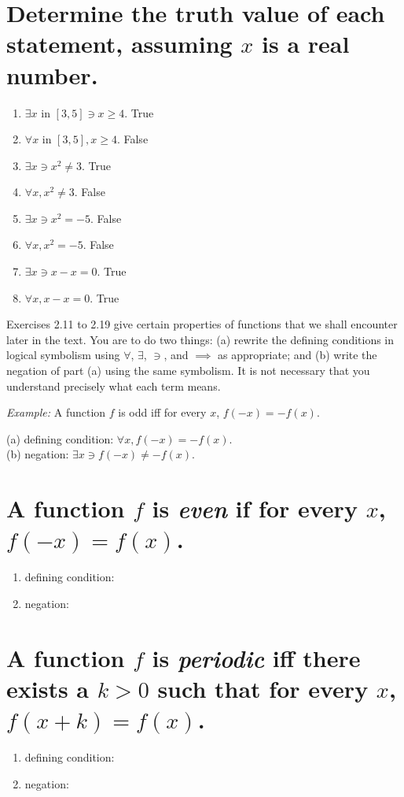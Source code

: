 \documentclass[11pt]{article} %
\begin{document}
\section{Determine the truth value of each statement, assuming $x$ is a real number.}
\begin{enumerate}
\item $\exists x$ in $\left[ 3,5 \right]\ni x\geq4$.
\subitem True
\item $\forall x$ in $\left[ 3,5 \right], x\geq4$.
\subitem False
\item $\exists x \ni x^2 \neq 3$.
\subitem True
\item $\forall x, x^2 \neq 3$.
\subitem False
\item $\exists x \ni x^2 = -5$.
\subitem False
\item $\forall x, x^2 = -5$.
\subitem False
\item $\exists x \ni x-x=0$.
\subitem True
\item $\forall x, x-x=0$.
\subitem True
\end{enumerate}
\noindent
Exercises 2.11 to 2.19 give certain properties of functions that we shall encounter later in the text. You are to do two things: (a) rewrite the defining conditions in logical symbolism using $\forall$, $\exists$, $\ni$, and $\implies$ as appropriate; and (b) write the negation of part (a) using the same symbolism. It is not necessary that you understand precisely what each term means.
\begin{center}
\textit{Example:} A function $f$ is odd iff for every $x$, $f(-x)=-f(x)$.
\end{center}
\hspace*{4cm}(a) defining condition: $\forall x, f(-x)=-f(x)$.\\
\hspace*{4cm}(b) negation: $\exists x \ni f(-x)\neq-f(x)$.

\section{A function $f$ is \textit{even} if for every $x$, $f(-x)=f(x)$.}
\begin{enumerate}
\item defining condition:
\item negation:
\end{enumerate}

\section{A function $f$ is \textit{periodic} iff there exists a $k>0$ such that for every $x$, $f(x+k)=f(x)$.}
\begin{enumerate}
\item defining condition:
\item negation:
\end{enumerate}
\end{document}

